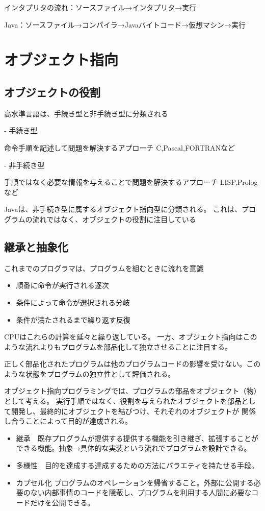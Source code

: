\documentclass[12pt,a4j,twoside]{jsbook}
\begin{document}
インタプリタの流れ：ソースファイル→インタプリタ→実行

Java：ソースファイル→コンパイラ→Javaバイトコード→仮想マシン→実行


\section{オブジェクト指向}
\subsection{オブジェクトの役割}
高水準言語は、手続き型と非手続き型に分類される

-   手続き型

命令手順を記述して問題を解決するアプローチ
C,Pascal,FORTRANなど

-   非手続き型

手順ではなく必要な情報を与えることで問題を解決するアプローチ
LISP,Prologなど


Javaは、非手続き型に属するオブジェクト指向型に分類される。
これは、プログラムの流れではなく、オブジェクトの役割に注目している

\subsection*{継承と抽象化}
これまでのプログラマは、プログラムを組むときに流れを意識
\begin{itemize}
    \item 順番に命令が実行される逐次
    \item 条件によって命令が選択される分岐
    \item 条件が満たされるまで繰り返す反復
\end{itemize}
CPUはこれらの計算を延々と繰り返している。
一方、オブジェクト指向はこのような流れよりもプログラムを部品化して独立させることに注目する。

正しく部品化されたプログラムは他のプログラムコードの影響を受けない。このような状態をプログラムの独立性として評価される。

オブジェクト指向プログラミングでは、プログラムの部品をオブジェクト（物）として考える。
実行手順ではなく、役割を与えられたオブジェクトを部品として開発し、最終的にオブジェクトを結びつけ、それぞれのオブジェクトが
関係し合うことによって目的が達成される。

\begin{itemize}
    \item 継承　\quad 既存プログラムが提供する提供する機能を引き継ぎ、拡張することができる機能。抽象→具体的な実装という流れでプログラムを設計できる。
    \item 多様性　\quad 目的を達成する達成するための方法にバラエティを持たせる手段。
    \item カプセル化 \quad プログラムのオペレーションを帰省すること。外部に公開する必要のない内部事情のコードを隠蔽し、プログラムを利用する人間に必要なコードだけを公開できる。
\end{itemize}
\end{document}
